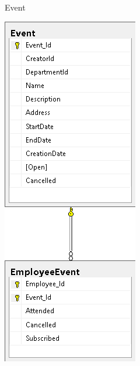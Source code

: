 \begin{frame}{Event}
  \begin{center}
    \includegraphics[height=0.9\textheight]{images/database/Event.png}
  \end{center}
\end{frame}
